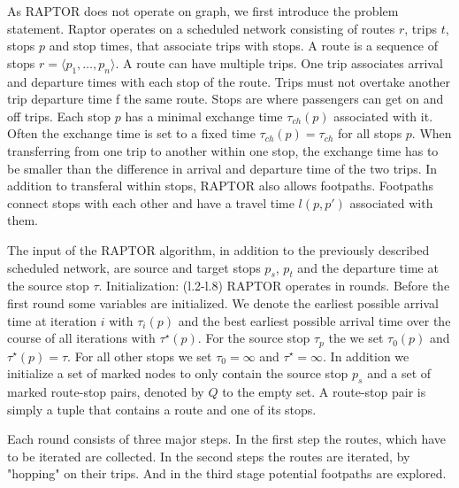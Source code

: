 As RAPTOR does not operate on graph, we first introduce the problem statement.
Raptor operates on a scheduled network consisting of routes $r$, trips $t$, stops $p$ and stop times, that associate trips with stops.
A route is a sequence of stops $r = \langle p_1, \dots, p_n \rangle$.
A route can have multiple trips.
One trip associates arrival and departure times with each stop of the route.
Trips must not overtake another trip departure time f the same route.
Stops are where passengers can get on and off trips.
Each stop $p$ has a minimal exchange time $\tau_{ch}(p)$ associated with it.
Often the exchange time is set to a fixed time $\tau_{ch}(p) = \tau_{ch}$ for all stops $p$.
When transferring from one trip to another within one stop, the exchange time has to be smaller than the difference in arrival and departure time of the two trips.
In addition to transferal within stops, RAPTOR also allows footpaths.
Footpaths connect stops with each other and have a travel time $l(p, p')$ associated with them.

The input of the RAPTOR algorithm, in addition to the previously described scheduled network, are source and target stops $p_s$, $p_t$ and the departure time at the source stop $\tau$.
Initialization: (l.2-l.8)
RAPTOR operates in rounds. Before the first round some variables are initialized.
We denote the earliest possible arrival time at iteration $i$ with $\tau_i(p)$ and the best earliest possible arrival time over the course of all iterations with $\tau^\star(p)$. For the source stop $\tau_p$ the we set $\tau_0(p)$ and $\tau^\star(p)=\tau$. For all other stops we set $\tau_0=\infty$ and $\tau^\star=\infty$.
In addition we initialize a set of marked nodes to only contain the source stop $p_s$ and a set of marked route-stop pairs, denoted by $Q$ to the empty set. A route-stop pair is simply a tuple that contains a route and one of its stops.


Each round consists of three major steps. In the first step the routes, which have to be iterated are collected. In the second steps the routes are iterated, by "hopping" on their trips. And in the third stage potential footpaths are explored.

